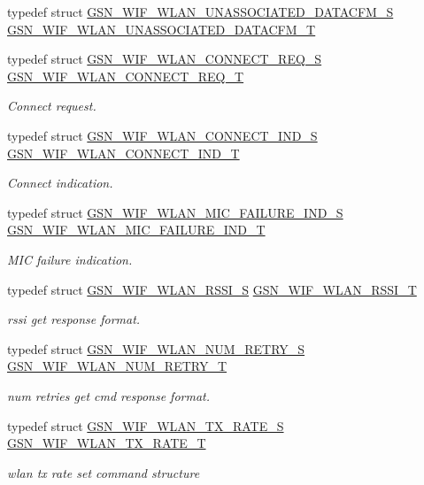 \begin{DoxyCompactItemize}
\item 
typedef struct \hyperlink{a00414}{GSN\_\-WIF\_\-WLAN\_\-UNASSOCIATED\_\-DATACFM\_\-S} \hyperlink{a00677_gabaad9b9d5e1ea42d58c557ee71b1469b}{GSN\_\-WIF\_\-WLAN\_\-UNASSOCIATED\_\-DATACFM\_\-T}
\item 
typedef struct \hyperlink{a00374}{GSN\_\-WIF\_\-WLAN\_\-CONNECT\_\-REQ\_\-S} \hyperlink{a00677_ga017431808d3e402931e4b6bfd133240b}{GSN\_\-WIF\_\-WLAN\_\-CONNECT\_\-REQ\_\-T}
\begin{DoxyCompactList}\small\item\em Connect request. \end{DoxyCompactList}\item 
typedef struct \hyperlink{a00373}{GSN\_\-WIF\_\-WLAN\_\-CONNECT\_\-IND\_\-S} \hyperlink{a00677_gafb178a89c3d7936c482fd6c6cb2e17af}{GSN\_\-WIF\_\-WLAN\_\-CONNECT\_\-IND\_\-T}
\begin{DoxyCompactList}\small\item\em Connect indication. \end{DoxyCompactList}\item 
typedef struct \hyperlink{a00391}{GSN\_\-WIF\_\-WLAN\_\-MIC\_\-FAILURE\_\-IND\_\-S} \hyperlink{a00677_ga7692f300e14cded7c79c50838226ed2b}{GSN\_\-WIF\_\-WLAN\_\-MIC\_\-FAILURE\_\-IND\_\-T}
\begin{DoxyCompactList}\small\item\em MIC failure indication. \end{DoxyCompactList}\item 
typedef struct \hyperlink{a00395}{GSN\_\-WIF\_\-WLAN\_\-RSSI\_\-S} \hyperlink{a00677_ga6bf98e2985565ecb3084ad0fb0d0e8c8}{GSN\_\-WIF\_\-WLAN\_\-RSSI\_\-T}
\begin{DoxyCompactList}\small\item\em rssi get response format. \end{DoxyCompactList}\item 
typedef struct \hyperlink{a00392}{GSN\_\-WIF\_\-WLAN\_\-NUM\_\-RETRY\_\-S} \hyperlink{a00677_ga941d2bc71947bd100c963211cf48a341}{GSN\_\-WIF\_\-WLAN\_\-NUM\_\-RETRY\_\-T}
\begin{DoxyCompactList}\small\item\em num retries get cmd response format. \end{DoxyCompactList}\item 
typedef struct \hyperlink{a00409}{GSN\_\-WIF\_\-WLAN\_\-TX\_\-RATE\_\-S} \hyperlink{a00677_ga3248623873f75304b338528b6c711975}{GSN\_\-WIF\_\-WLAN\_\-TX\_\-RATE\_\-T}
\begin{DoxyCompactList}\small\item\em wlan tx rate set command structure \end{DoxyCompactList}\item 

\end{DoxyCompactItemize}
